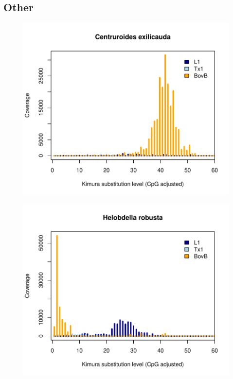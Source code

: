 \documentclass[12pt,a4paper,times]{article}
\begin{document}
\subsection*{Other}

\begin{figure}[H]
	\centering
	\includegraphics[scale=0.8]{suppFigures/divergencePlots/Centruroides_exilicauda.pdf}
	\caption{\label{Centruroides_exilicauda}}
\end{figure}

\begin{figure}[H]
	\centering
	\includegraphics[scale=0.8]{suppFigures/divergencePlots/Helobdella_robusta.pdf}
	\caption{\label{Helobdella_robusta}}
\end{figure}
\end{document}
